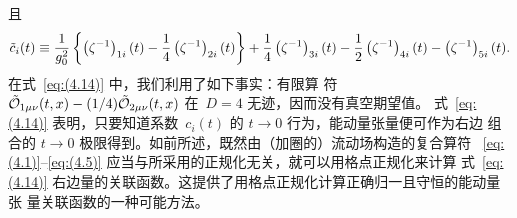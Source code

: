 且
\begin{equation}
   \Tilde{c}_i(t)\equiv\frac{1}{g_0^2}\left\{
   \left(\zeta^{-1}\right)_{1i}(t)
   -\frac{1}{4}\left(\zeta^{-1}\right)_{2i}(t)\right\}
   +\frac{1}{4}\left(\zeta^{-1}\right)_{3i}(t)
   -\frac{1}{2}\left(\zeta^{-1}\right)_{4i}(t)
   -\left(\zeta^{-1}\right)_{5i}(t).
\label{eq:(4.16)}
\end{equation}
在式~\eqref{eq:(4.14)} 中，我们利用了如下事实：有限算
符 $\Tilde{\mathcal{O}}_{1\mu\nu}(t,x)-(1/4)\Tilde{\mathcal{O}}_{2\mu\nu}(t,x)$
在~$D=4$ 无迹，因而没有真空期望值。
式~\eqref{eq:(4.14)} 表明，只要知道系数~$c_i(t)$ 的 $t\to0$ 行为，能动量张量便可作为右边
组合的 $t\to0$ 极限得到。如前所述，既然由（加圈的）流动场构造的复合算符%
~\eqref{eq:(4.1)}--\eqref{eq:(4.5)} 应当与所采用的正规化无关，就可以用格点正规化来计算
式~\eqref{eq:(4.14)} 右边量的关联函数。这提供了用格点正规化计算正确归一且守恒的能动量张
量关联函数的一种可能方法。


